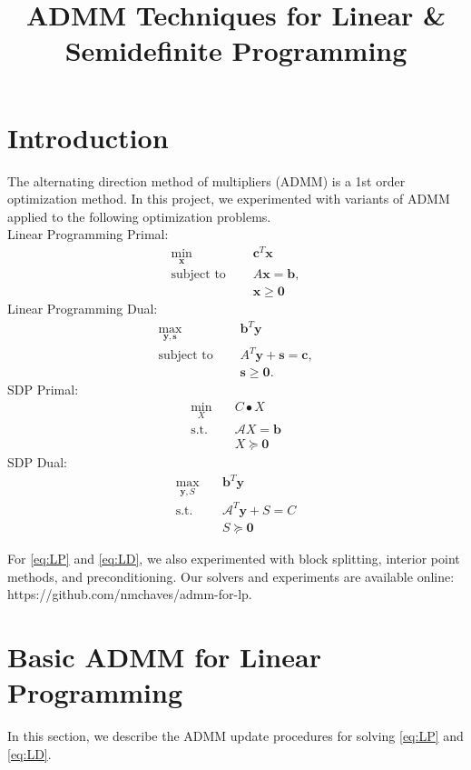 \documentclass{article}
\title{ADMM Techniques for Linear \& Semidefinite Programming }
\author{\studentname}
\begin{document}
\maketitle

\section{Introduction}
The alternating direction method of multipliers (ADMM) is a 1st order optimization method. In this project, we experimented with variants of ADMM applied to the following optimization problems. \\
Linear Programming Primal:
\begin{align}
\min_{\mathbf{x}} &\quad \mathbf{c}^T\mathbf{x} \tag{LP}\label{eq:LP} \\
\text{subject to } &\quad  A \mathbf{x} = \mathbf{b},  \nonumber \\
&\quad \mathbf{x} \geq \mathbf{0} \nonumber 
\end{align}
Linear Programming Dual:
\begin{align}
\max_{\mathbf{y}, \mathbf{s}} &\quad \mathbf{b}^T\mathbf{y}  \tag{LD}\label{eq:LD} \\
\text{subject to } &\quad  A^T \mathbf{y}  + \mathbf{s} = \mathbf{c},  \nonumber \\
&\quad \mathbf{s} \geq \mathbf{0} \nonumber.
\end{align}
SDP Primal:
\begin{align}
\min_{X} &\quad C\bullet X  \tag{SDP}\label{eq:SDP} \\
\text{s.t.} &\quad \mathcal{A}X=\mathbf{b} \nonumber \\
&\quad X\succeq \mathbf{0} \nonumber
\end{align}
SDP Dual:
\begin{align}
\max_{\mathbf{y},S} &\quad \mathbf{b}^{T}\mathbf{y} \tag{SDD}\label{eq:SDD}  \\
\text{s.t.} &\quad \mathcal{A}^{T}\mathbf{y}+S=C \nonumber \\
&\quad S\succeq\mathbf{0} \nonumber
\end{align}

For \eqref{eq:LP} and \eqref{eq:LD}, we also experimented with block splitting, interior point methods, and preconditioning. Our solvers and experiments are available online: https://github.com/nmchaves/admm-for-lp. 

\section{Basic ADMM for Linear Programming}
In this section, we describe the ADMM update procedures for solving \eqref{eq:LP} and \eqref{eq:LD}.
\end{document}
